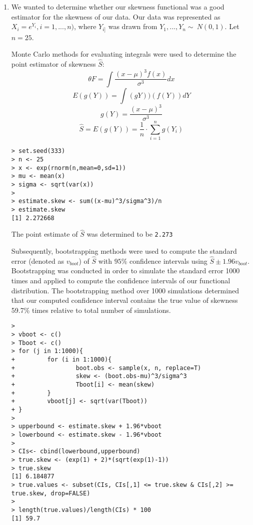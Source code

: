 \documentclass[letterpaper]{article}
\begin{document}
\begin{enumerate}
\item We wanted to determine whether our skewness functional was a good estimator for the skewness of our data. Our data was represented as $X_{i} = e^{Y_{i}}, i = 1,...,n)$, where $Y_{i]}$ was drawn from $Y_{1},...,Y_{n} \sim ~ N(0,1)$. Let $n = 25$. 

Monte Carlo methods for evaluating integrals were used to determine the point estimator of skewness $\hat{S}$: 
$$\theta F = \int \frac{(x-\mu)^{3}f(x)}{\sigma^{3}} dx $$
$$E(g(Y)) = \int(gY))(f(Y)) dY$$ 
$$g(Y) = \frac{(x-\mu)^{3}}{\sigma^{3}}$$
$$\hat{S} = E(g(Y)) = \frac{1}{n} \cdot \sum^{n}_{i=1}{g(Y_{i})} $$


\begin{verbatim}
> set.seed(333)
> n <- 25
> x <- exp(rnorm(n,mean=0,sd=1))
> mu <- mean(x)
> sigma <- sqrt(var(x))
> 
> estimate.skew <- sum((x-mu)^3/sigma^3)/n
> estimate.skew
[1] 2.272668

\end{verbatim}

The point estimate of $\hat{S}$ was determined to be \texttt{2.273}

Subsequently, bootstrapping methods were used to compute the standard error (denoted as $v_{boot}$) of $\hat{S}$ with $95\%$ confidence intervals using $\hat{S} \pm 1.96v_{boot}$. Bootstrapping was conducted in order to simulate the standard error 1000 times and applied to compute the confidence intervals of our functional distribution. The bootstrapping method over 1000 simulations determined that our computed confidence interval contains the true value of skewness 59.7\% times relative to total number of simulations.

\begin{verbatim}
> 
> vboot <- c()
> Tboot <- c()
> for (j in 1:1000){
+         for (i in 1:1000){
+                 boot.obs <- sample(x, n, replace=T)
+                 skew <- (boot.obs-mu)^3/sigma^3
+                 Tboot[i] <- mean(skew)
+         }
+         vboot[j] <- sqrt(var(Tboot))
+ }
> 
> upperbound <- estimate.skew + 1.96*vboot
> lowerbound <- estimate.skew - 1.96*vboot
> 
> CIs<- cbind(lowerbound,upperbound)
> true.skew <- (exp(1) + 2)*(sqrt(exp(1)-1))
> true.skew
[1] 6.184877
> true.values <- subset(CIs, CIs[,1] <= true.skew & CIs[,2] >= true.skew, drop=FALSE)
> 
> length(true.values)/length(CIs) * 100
[1] 59.7
\end{verbatim}


\end{enumerate}
\end{document}
